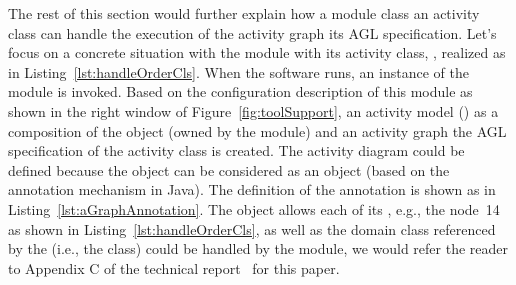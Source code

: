 The rest of this section would further explain how a module class \wrt an activity class can handle the execution of the activity graph \wrt its AGL specification. Let's focus on a concrete situation with the   module with its activity class, , realized as in Listing~\ref{lst:handleOrderCls}. %
%
When the software runs, an instance of the  module is invoked. Based on the configuration description of this module as shown in the right window of Figure~\ref{fig:toolSupport}, an activity model () as a composition of the  object (owned by the  module) and an activity graph \wrt the AGL specification of the activity class  is created. The activity diagram could be defined because the  object can be considered as an  object (based on the annotation mechanism in Java). The definition of the annotation  is shown as in Listing~\ref{lst:aGraphAnnotation}. 
%
The  object allows each of its , e.g., the  \wrt node~14 as shown in Listing~\ref{lst:handleOrderCls}, as well as the domain class referenced by the  (i.e., the  class) could be handled by the  module, we would refer the reader to Appendix C of the technical report~\cite{dang2023aglTechReport} for this paper.


























 